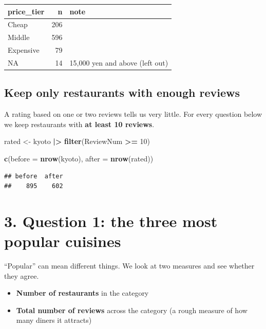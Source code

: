 \documentclass[
]{article}
\newenvironment{Shaded}{\begin{snugshade}}{\end{snugshade}}
\newcommand{\AttributeTok}[1]{\textcolor[rgb]{0.13,0.29,0.53}{#1}}
\newcommand{\DecValTok}[1]{\textcolor[rgb]{0.00,0.00,0.81}{#1}}
\newcommand{\FunctionTok}[1]{\textcolor[rgb]{0.13,0.29,0.53}{\textbf{#1}}}
\newcommand{\NormalTok}[1]{#1}
\newcommand{\OtherTok}[1]{\textcolor[rgb]{0.56,0.35,0.01}{#1}}
\newcommand{\SpecialCharTok}[1]{\textcolor[rgb]{0.81,0.36,0.00}{\textbf{#1}}}
\newcounter{none} %
\providecommand{\tightlist}{%
  \setlength{\itemsep}{0pt}\setlength{\parskip}{0pt}}
\begin{document}
{\def\LTcaptype{none} %
\begin{longtable}[]{@{}lrl@{}}
\toprule\noalign{}
price\_tier & n & note \\
\midrule\noalign{}
\endhead
\bottomrule\noalign{}
\endlastfoot
Cheap & 206 & \\
Middle & 596 & \\
Expensive & 79 & \\
NA & 14 & 15,000 yen and above (left out) \\
\end{longtable}
}

\subsection{Keep only restaurants with enough
reviews}\label{keep-only-restaurants-with-enough-reviews}

A rating based on one or two reviews tells us very little. For every
question below we keep restaurants with \textbf{at least 10 reviews}.

\begin{Shaded}
\begin{Highlighting}[]
\NormalTok{rated }\OtherTok{\textless{}{-}}\NormalTok{ kyoto }\SpecialCharTok{|\textgreater{}} \FunctionTok{filter}\NormalTok{(ReviewNum }\SpecialCharTok{\textgreater{}=} \DecValTok{10}\NormalTok{)}

\FunctionTok{c}\NormalTok{(}\AttributeTok{before =} \FunctionTok{nrow}\NormalTok{(kyoto), }\AttributeTok{after =} \FunctionTok{nrow}\NormalTok{(rated))}
\end{Highlighting}
\end{Shaded}

\begin{verbatim}
## before  after 
##    895    602
\end{verbatim}

\section{3. Question 1: the three most popular
cuisines}\label{question-1-the-three-most-popular-cuisines}

``Popular'' can mean different things. We look at two measures and see
whether they agree.

\begin{itemize}
\tightlist
\item
  \textbf{Number of restaurants} in the category
\item
  \textbf{Total number of reviews} across the category (a rough measure
  of how many diners it attracts)
\end{itemize}
\end{document}
